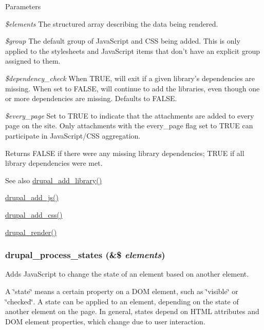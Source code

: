 \begin{DoxyParams}{Parameters}
\item[{\em \$elements}]The structured array describing the data being rendered. \item[{\em \$group}]The default group of JavaScript and CSS being added. This is only applied to the stylesheets and JavaScript items that don't have an explicit group assigned to them. \item[{\em \$dependency\_\-check}]When TRUE, will exit if a given library's dependencies are missing. When set to FALSE, will continue to add the libraries, even though one or more dependencies are missing. Defaults to FALSE. \item[{\em \$every\_\-page}]Set to TRUE to indicate that the attachments are added to every page on the site. Only attachments with the every\_\-page flag set to TRUE can participate in JavaScript/CSS aggregation.\end{DoxyParams}
\begin{DoxyReturn}{Returns}
FALSE if there were any missing library dependencies; TRUE if all library dependencies were met.
\end{DoxyReturn}
\begin{DoxySeeAlso}{See also}
\hyperlink{common_8inc_a10d0b7349429391743b9ffc49b48908a}{drupal\_\-add\_\-library()} 

\hyperlink{common_8inc_a623370a2c3c2de0390dab078d17dca02}{drupal\_\-add\_\-js()} 

\hyperlink{common_8inc_a2c5bb2667efb44b02f1a105c0bfdebe5}{drupal\_\-add\_\-css()} 

\hyperlink{common_8inc_a05798b44e8d6c496d4bee5cc32fa7851}{drupal\_\-render()} 
\end{DoxySeeAlso}
\hypertarget{common_8inc_a335ef221d12db75393875deed0622ea1}{
\subsubsection[{drupal\_\-process\_\-states}]{\setlength{\rightskip}{0pt plus 5cm}drupal\_\-process\_\-states (\&\$ {\em elements})}}
\label{common_8inc_a335ef221d12db75393875deed0622ea1}
Adds JavaScript to change the state of an element based on another element.

A \char`\"{}state\char`\"{} means a certain property on a DOM element, such as \char`\"{}visible\char`\"{} or \char`\"{}checked\char`\"{}. A state can be applied to an element, depending on the state of another element on the page. In general, states depend on HTML attributes and DOM element properties, which change due to user interaction.

